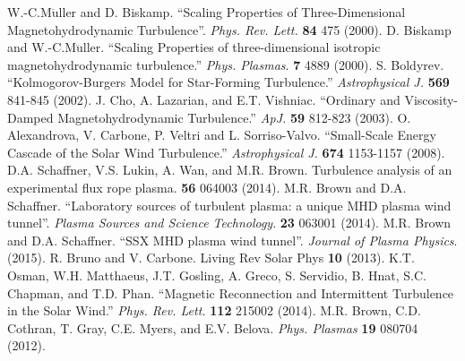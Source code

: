 \documentclass[preprint2]{aastex}
\begin{document}
\begin{thebibliography}{}
 W.-C.M$\ddot{\mathrm{u}}$ller and D. Biskamp. ``Scaling Properties of Three-Dimensional Magnetohydrodynamic Turbulence''. {\it Phys. Rev. Lett.} {\bf 84} 475 (2000).
 D. Biskamp and W.-C.M$\ddot{\mathrm{u}}$ller. ``Scaling Properties of three-dimensional isotropic magnetohydrodynamic turbulence.'' {\it Phys. Plasmas}. {\bf 7} 4889 (2000).
 S. Boldyrev. ``Kolmogorov-Burgers Model for Star-Forming Turbulence.'' {\it Astrophysical J.} {\bf 569} 841-845 (2002).
 J. Cho, A. Lazarian, and E.T. Vishniac. ``Ordinary and Viscosity-Damped Magnetohydrodynamic Turbulence.'' {\it ApJ.} {\bf 59} 812-823 (2003).
 O. Alexandrova, V. Carbone, P. Veltri and L. Sorriso-Valvo. ``Small-Scale Energy Cascade of the Solar Wind Turbulence.'' {\it Astrophysical J.} {\bf 674} 1153-1157 (2008).
 D.A. Schaffner, V.S. Lukin, A. Wan, and M.R. Brown. Turbulence analysis of an experimental flux rope plasma. {\bf 56} 064003 (2014).
 M.R. Brown and D.A. Schaffner. ``Laboratory sources of turbulent plasma: a unique MHD plasma wind tunnel''. {\it Plasma Sources and Science Technology}. {\bf 23} 063001 (2014).
 M.R. Brown and D.A. Schaffner. ``SSX MHD plasma wind tunnel''. {\it Journal of Plasma Physics}. (2015).
 R. Bruno and V. Carbone. Living Rev Solar Phys {\bf 10} (2013).
 K.T. Osman, W.H. Matthaeus, J.T. Gosling, A. Greco, S. Servidio, B. Hnat, S.C. Chapman, and T.D. Phan. ``Magnetic Reconnection and Intermittent Turbulence in the Solar Wind.'' {\it Phys. Rev. Lett.} {\bf 112} 215002 (2014).
 M.R. Brown, C.D. Cothran, T. Gray, C.E. Myers, and E.V. Belova. {\it Phys. Plasmas} {\bf 19} 080704 (2012).





\end{thebibliography}
\end{document}

